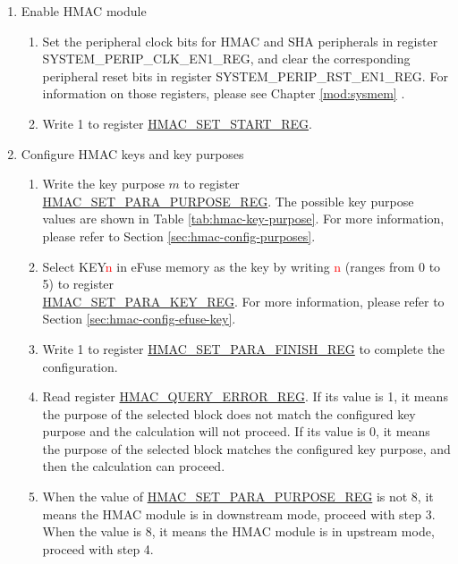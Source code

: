 \documentclass[main\_\_EN.tex]{subfiles}
\begin{document}
\begin{enumerate}
    \item Enable HMAC module
    \begin{enumerate}
        \item Set the peripheral clock bits for HMAC and SHA peripherals in register SYSTEM\_PERIP\_CLK\_EN1\_REG, and clear the corresponding peripheral reset bits in register SYSTEM\_PERIP\_RST\_EN1\_REG. For information on those registers, please see Chapter \ref{mod:sysmem} \textit{}.
        \item Write 1 to register \hyperref[regdesc:HMACSETSTARTREG]{HMAC\_SET\_START\_REG}.
    \end{enumerate}

    \item Configure HMAC keys and key purposes
    \begin{enumerate}
        \item Write the key purpose \begin{math}m\end{math} to register \hyperref[regdesc:HMACSETPARAPURPOSEREG]{HMAC\_SET\_PARA\_PURPOSE\_REG}. The possible key purpose values are shown in Table \ref{tab:hmac-key-purpose}. For more information, please refer to Section \ref{sec:hmac-config-purposes}.
        \item Select KEY\textcolor{red}{n} in eFuse memory as the key by writing \textcolor{red}{n} (ranges from 0 to 5) to register\\ \hyperref[regdesc:HMACSETPARAKEYREG]{HMAC\_SET\_PARA\_KEY\_REG}. For more information, please refer to Section \ref{sec:hmac-config-efuse-key}.
        \item Write 1 to register \hyperref[regdesc:HMACSETPARAFINISHREG]{HMAC\_SET\_PARA\_FINISH\_REG} to complete the configuration.
        \item Read register \hyperref[regdesc:HMACQUERYERRORREG]{HMAC\_QUERY\_ERROR\_REG}. If its value is 1, it means the purpose of the selected block does not match the configured key purpose and the calculation will not proceed. If its value is 0, it means the purpose of the selected block matches the configured key purpose, and then the calculation can proceed.
        \item When the value of \hyperref[regdesc:HMACSETPARAPURPOSEREG]{HMAC\_SET\_PARA\_PURPOSE\_REG} is not 8, it means the HMAC module is in downstream mode, proceed with step 3. When the value is 8, it means the HMAC module is in upstream mode, proceed with step 4.
    \end{enumerate}


\end{enumerate}
\end{document}
